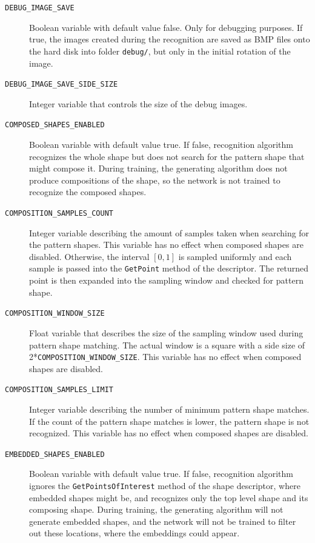 \begin{description}
\item[\texttt{DEBUG\_IMAGE\_SAVE}] Boolean variable with default value false. Only for debugging purposes. If true, the images created during the recognition are saved as BMP files onto the hard disk into folder \texttt{debug/}, but only in the initial rotation of the image.

\item[\texttt{DEBUG\_IMAGE\_SAVE\_SIDE\_SIZE}] Integer variable that controls the size of the debug images.

\item[\texttt{COMPOSED\_SHAPES\_ENABLED}] Boolean variable with default value true. If false, recognition algorithm recognizes the whole shape but does not search for the pattern shape that might compose it. During training, the generating algorithm does not produce compositions of the shape, so the network is not trained to recognize the composed shapes.

\item[\texttt{COMPOSITION\_SAMPLES\_COUNT}] Integer variable describing the amount of samples taken when searching for the pattern shapes. This variable has no effect when composed shapes are disabled. Otherwise, the interval $[0,1]$ is sampled uniformly and each sample is passed into the \texttt{GetPoint} method of the descriptor. The returned point is then expanded into the sampling window and checked for pattern shape.

\item[\texttt{COMPOSITION\_WINDOW\_SIZE}] Float variable that describes the size of the sampling window used during pattern shape matching. The actual window is a square with a side size of 2*\texttt{COMPOSITION\_WINDOW\_SIZE}. This variable has no effect when composed shapes are disabled.

\item[\texttt{COMPOSITION\_SAMPLES\_LIMIT}] Integer variable describing the number of minimum pattern shape matches. If the count of the pattern shape matches is lower, the pattern shape is not recognized. This variable has no effect when composed shapes are disabled.

\item[\texttt{EMBEDDED\_SHAPES\_ENABLED}] Boolean variable with default value true. If false, recognition algorithm ignores the \texttt{GetPointsOfInterest} method of the shape descriptor, where embedded shapes might be, and recognizes only the top level shape and its composing shape. During training, the generating algorithm will not generate embedded shapes, and the network will not be trained to filter out these locations, where the embeddings could appear.


\end{description}
